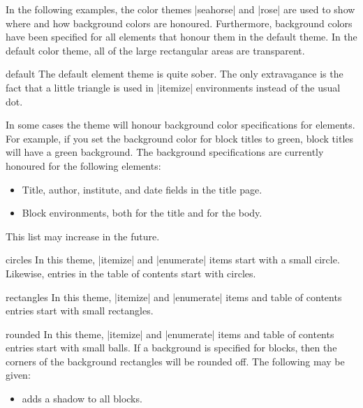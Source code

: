 In the following examples, the color themes |seahorse| and |rose| are used to show where and how background colors are honoured. Furthermore, background colors have been specified for all elements that honour them in the default theme. In the default color theme, all of the large rectangular areas are transparent.

\begin{innerthemeexample}{default}
  The default element theme is quite sober. The only extravagance is the fact that a little triangle is used in |itemize| environments instead of the usual dot.

  In some cases the theme will honour background color specifications for elements. For example, if you set the background color for block titles to green, block titles will have a green background. The background specifications are currently honoured for the following elements:
  \begin{itemize}
    \item Title, author, institute, and date fields in the title page.
    \item Block environments, both for the title and for the body.
  \end{itemize}
  This list may increase in the future.
\end{innerthemeexample}

\begin{innerthemeexample}{circles}
  In this theme, |itemize| and |enumerate| items start with a small circle. Likewise, entries in the table of contents start with circles.
\end{innerthemeexample}

\begin{innerthemeexample}{rectangles}
  In this theme, |itemize| and |enumerate| items and table of contents entries start with small rectangles.
\end{innerthemeexample}

\begin{innerthemeexample}{rounded}
  In this theme, |itemize| and |enumerate| items and table of contents entries start with small balls. If a background is specified for blocks, then the corners of the background rectangles will be rounded off. The following  may be given:

  \begin{itemize}
    \item {} adds a shadow to all blocks.
  \end{itemize}
\end{innerthemeexample}

